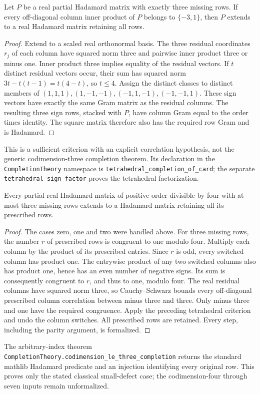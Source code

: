 \begin{theorem}
Let $P$ be a real partial Hadamard matrix with exactly three missing
rows. If every off-diagonal column inner product of $P$ belongs to
$\{-3,1\}$, then $P$ extends to a real Hadamard matrix retaining all rows.
\end{theorem}
\begin{proof}
Extend to a scaled real orthonormal basis. The three residual coordinates
$r_j$ of each column have squared norm three and pairwise inner product
three or minus one. Inner product three implies equality of the residual
vectors. If $t$ distinct residual vectors occur, their sum has squared
norm $3t-t(t-1)=t(4-t)$, so $t\le4$. Assign the distinct classes to distinct
members of $(1,1,1),(1,-1,-1),(-1,1,-1),(-1,-1,1)$. These sign vectors have
exactly the same Gram matrix as the residual columns. The resulting
three sign rows, stacked with $P$, have column Gram equal to the order
times identity. The square matrix therefore also has the required row
Gram and is Hadamard.
\end{proof}
This is a sufficient criterion with an explicit correlation hypothesis,
not the generic codimension-three completion theorem. Its declaration in
the \texttt{CompletionTheory} namespace is
\texttt{tetrahedral\_completion\_of\_card}; the separate
\texttt{tetrahedral\_sign\_factor} proves the tetrahedral factorization.

\begin{theorem}
Every partial real Hadamard matrix of positive order divisible by four
with at most three missing rows extends to a Hadamard matrix retaining
all its prescribed rows.
\end{theorem}
\begin{proof}
The cases zero, one and two were handled above. For three missing rows,
the number $r$ of prescribed rows is congruent to one modulo four.
Multiply each column by the product of its prescribed entries. Since
$r$ is odd, every switched column has product one. The entrywise
product of any two switched columns also has product one, hence has an
even number of negative signs. Its sum is consequently congruent to
$r$, and thus to one, modulo four. The real residual columns have
squared norm three, so Cauchy--Schwarz bounds every off-diagonal
prescribed column correlation between minus three and three. Only
minus three and one have the required congruence. Apply the preceding
tetrahedral criterion and undo the column switches. All prescribed rows
are retained. Every step, including the parity argument, is formalized.
\end{proof}
The arbitrary-index theorem
\texttt{CompletionTheory.codimension\_le\_three\_completion}
returns the standard mathlib Hadamard predicate and an injection identifying
every original row. This proves only the stated classical small-defect
case; the codimension-four through seven inputs remain unformalized.
